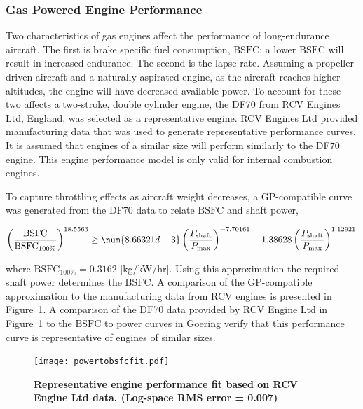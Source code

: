 \subsubsection{Gas Powered Engine Performance}

Two characteristics of gas engines affect the performance of long-endurance aircraft.  
The first is brake specific fuel consumption, $\text{BSFC}$; a lower $\text{BSFC}$ will result in increased endurance.  
The second is the lapse rate.  
Assuming a propeller driven aircraft and a naturally aspirated engine, as the aircraft reaches higher altitudes, the engine will have decreased available power. 
To account for these two affects a two-stroke, double cylinder engine, the DF70 from RCV Engines Ltd, England, was selected as a representative engine.  
RCV Engines Ltd provided manufacturing data that was used to generate representative performance curves.\cite{rcvengines}
It is assumed that engines of a similar size will perform similarly to the DF70 engine.  
This engine performance model is only valid for internal combustion engines.

To capture throttling effects as aircraft weight decreases, a GP-compatible curve was generated from the DF70 data to relate $\text{BSFC}$ and shaft power, 

\begin{equation}
    \label{e:rpmtobsfc}
    \left( \frac{\text{BSFC}}{\text{BSFC}_{100\%}} \right)^{18.5563} \geq \num{8.66321d-3}\left( \frac{P_{\text{shaft}}}{P_{\text{max}}}\right)^{-7.70161} + 1.38628\left( \frac{P_{\text{shaft}}}{P_{\text{max}}} \right)^{1.12921} \\
\end{equation}

where $\text{BSFC}_{100\%} = 0.3162$ [kg/kW/hr].\cite{rcvengines}
Using this approximation the required shaft power determines the $\text{BSFC}$.
A comparison of the GP-compatible approximation to the manufacturing data from RCV engines is presented in Figure~\ref{f:powervsweightfit}. A comparison of the DF70 data provided by RCV Engine Ltd in Figure~\ref{f:powervsweightfit} to the $\text{BSFC}$ to power curves in Goering\cite{bsfcperf} verify that this performance curve is representative of engines of similar sizes. 

\begin{figure}[H]
	\begin{center}
	\texttt{[image: powertobsfcfit.pdf]}
    \caption{\textbf{Representative engine performance fit based on RCV Engine Ltd data.  (Log-space RMS error = 0.007) }}
	\label{f:powervsweightfit}
	\end{center}
\end{figure}

